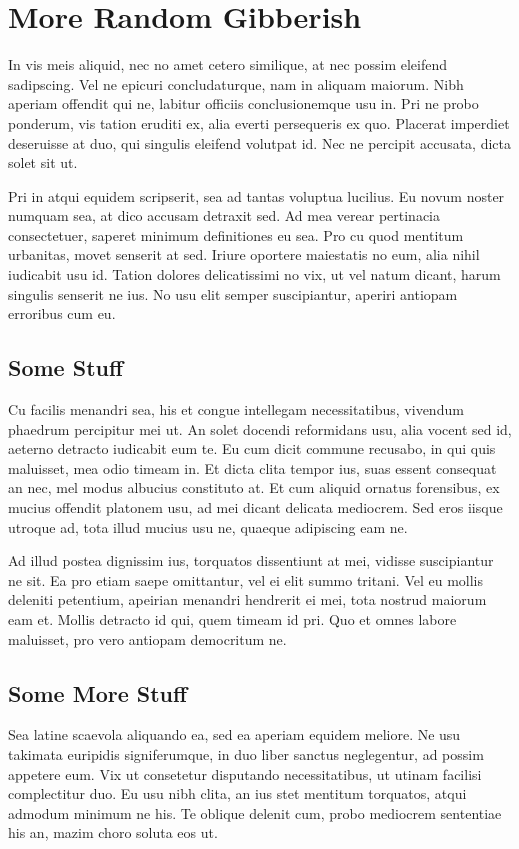 \section{More Random Gibberish}

In vis meis aliquid, nec no amet cetero similique, at nec possim eleifend sadipscing. Vel ne epicuri concludaturque, nam in aliquam maiorum. Nibh aperiam offendit qui ne, labitur officiis conclusionemque usu in. Pri ne probo ponderum, vis tation eruditi ex, alia everti persequeris ex quo. Placerat imperdiet deseruisse at duo, qui singulis eleifend volutpat id. Nec ne percipit accusata, dicta solet sit ut.

Pri in atqui equidem scripserit, sea ad tantas voluptua lucilius. Eu novum noster numquam sea, at dico accusam detraxit sed. Ad mea verear pertinacia consectetuer, saperet minimum definitiones eu sea. Pro cu quod mentitum urbanitas, movet senserit at sed. Iriure oportere maiestatis no eum, alia nihil iudicabit usu id. Tation dolores delicatissimi no vix, ut vel natum dicant, harum singulis senserit ne ius. No usu elit semper suscipiantur, aperiri antiopam erroribus cum eu.

\subsection{Some Stuff}

Cu facilis menandri sea, his et congue intellegam necessitatibus, vivendum phaedrum percipitur mei ut. An solet docendi reformidans usu, alia vocent sed id, aeterno detracto iudicabit eum te. Eu cum dicit commune recusabo, in qui quis maluisset, mea odio timeam in. Et dicta clita tempor ius, suas essent consequat an nec, mel modus albucius constituto at. Et cum aliquid ornatus forensibus, ex mucius offendit platonem usu, ad mei dicant delicata mediocrem. Sed eros iisque utroque ad, tota illud mucius usu ne, quaeque adipiscing eam ne.

Ad illud postea dignissim ius, torquatos dissentiunt at mei, vidisse suscipiantur ne sit. Ea pro etiam saepe omittantur, vel ei elit summo tritani. Vel eu mollis deleniti petentium, apeirian menandri hendrerit ei mei, tota nostrud maiorum eam et. Mollis detracto id qui, quem timeam id pri. Quo et omnes labore maluisset, pro vero antiopam democritum ne.

\subsection{Some More Stuff}

Sea latine scaevola aliquando ea, sed ea aperiam equidem meliore. Ne usu takimata euripidis signiferumque, in duo liber sanctus neglegentur, ad possim appetere eum. Vix ut consetetur disputando necessitatibus, ut utinam facilisi complectitur duo. Eu usu nibh clita, an ius stet mentitum torquatos, atqui admodum minimum ne his. Te oblique delenit cum, probo mediocrem sententiae his an, mazim choro soluta eos ut.